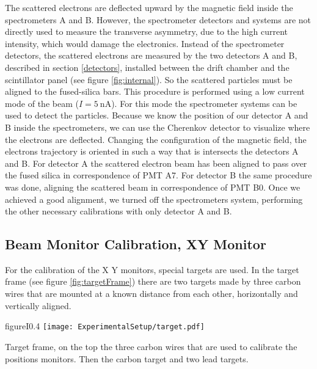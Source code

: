 The scattered electrons are deflected upward by the magnetic field inside the spectrometers A and B. However, the spectrometer detectors and systems are not directly used to measure the transverse asymmetry, due to the high current intensity, which would damage the electronics.
Instead of the spectrometer detectors, the scattered electrons are measured by the two detectors A and B, described in section \ref{detectors}, installed between the drift chamber and the scintillator panel (see figure \ref{fig:internal}). So the scattered particles must be aligned to the fused-silica bars.
This procedure is performed using a low current mode of the beam ($I = \SI{5}{\nano \ampere}$). For this mode the spectrometer systems can be used to detect the particles. Because we know the position of our detector A and B inside the spectrometers, we can use the Cherenkov detector to visualize where the electrons are deflected. Changing the configuration of the magnetic field, the electrons trajectory is oriented in such a way that is intersects the detectors A and B. For detector A the scattered electron beam has been aligned to pass over the fused silica in correspondence of PMT A7. For detector B the same procedure was done, aligning the scattered beam in correspondence of PMT B0. 
 Once we achieved a good alignment, we turned off the spectrometers system, performing the other necessary calibrations with only detector A and B. 

\subsection{Beam Monitor Calibration, XY Monitor} \label{XYpos}

For the calibration of the X Y monitors, special targets are used. In the target frame (see figure \ref{fig:targetFrame}) there are two targets made by three carbon wires that are mounted at a known distance from each other, horizontally and vertically aligned. 

\begin{wrapfloat}{figure}{I}{0.4\textwidth}
\centering
\texttt{[image: ExperimentalSetup/target.pdf]}
\caption{\label{fig:targetFrame} Target frame, on the top the three carbon wires that are used to calibrate the positions monitors. Then the carbon target and two lead targets.}
\vspace{-0pt}
\end{wrapfloat}


